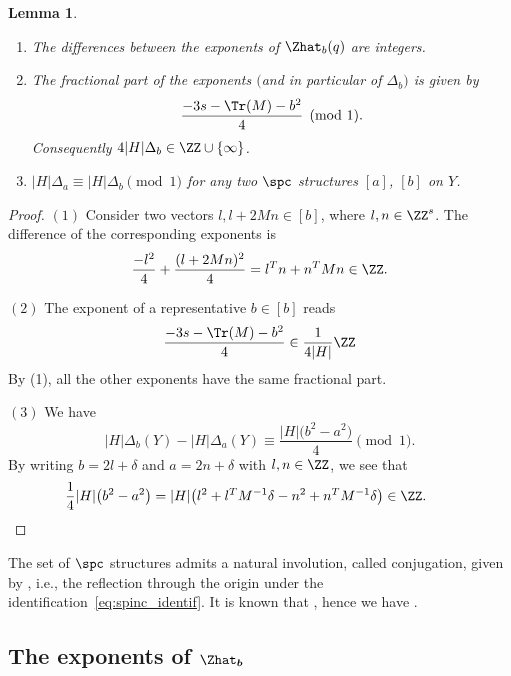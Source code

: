 \documentclass[pdftex]{sigma}
\newtheorem{Lemma}[Theorem]{Lemma}
\begin{document}
\begin{Lemma}%
 \leavevmode
 \begin{enumerate}\itemsep=0pt
 \item[$(1)$] The differences between the exponents of $\Zhat_b(q)$ are integers.
 \item[$(2)$] The fractional part of the exponents $($and in particular of $\Delta_b)$ is given by
 \[
 \frac{-3s - \Tr(M) -b^2}{4} {\pmod{1}}.
 \]
 Consequently $4 \lvert H \rvert \Delta_b \in \ZZ \cup \{\infty\}$.
 \item[$(3)$] $\lvert H\rvert\Delta_a \equiv \lvert H\rvert\Delta_{b} \pmod{1}$ for any two $\spc$ structures $[a]$, $[b]$ on $Y$.
\end{enumerate}
\end{Lemma}

\begin{proof}
$(1)$ Consider two vectors $l, l+2Mn \in [b]$, where $l,n \in \ZZ^s$. The difference of the corresponding exponents is
 \[
 \frac{-l^2}{4}+\frac{(l+2Mn)^2}{4} = l^Tn + n^T Mn \in \ZZ.
 \]

$(2)$ The exponent of a representative $b \in [b]$ reads
 \[
 \frac{-3s - \Tr(M) - b^2}{4} \in \frac{1}{4\lvert H\rvert}\ZZ
 \]
 By (1), all the other exponents have the same fractional part.

$(3)$
 We have
 \[
 \lvert H\rvert\Delta_b(Y) - \lvert H\rvert\Delta_{a}(Y) \equiv \frac{\lvert H\rvert\bigl(b^2 -a^2\bigr)}{4} \pmod{1}.
 \]
 By writing $b = 2l + \delta$ and $a = 2n+\delta$ with $l,n \in \ZZ$, we see that
 \[
 \frac{1}{4}\lvert H\rvert \bigl(b^2 - a^2\bigr) = \lvert H\rvert \bigl(l^2 + l^TM^{-1}\delta - n^2 + n^TM^{-1}\delta\bigr) \in \ZZ.
\tag*{\qed}
\]
\renewcommand{\qed}{}
\end{proof}

\begin{Remark}
The set of $\spc$ structures admits a natural involution, called conjugation, given by \smash{$[b] \mapsto \overline{[b]} := [-b]$}, i.e., the reflection through the origin under the identification~\eqref{eq:spinc_identif}. It is known that , hence we have \smash{$\Delta_{[b]\vphantom{\overline{[b]}}} =\Delta_{\overline{[b]}}$}.
\end{Remark}

\subsection[The exponents of Zhat\_b]{The exponents of $\boldsymbol{\Zhat_b}$}%
\end{document}
